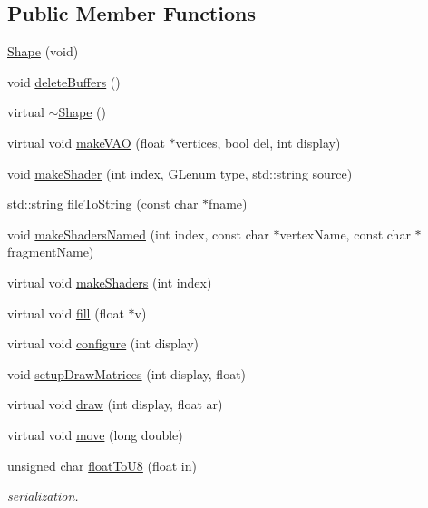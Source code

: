 \subsection*{Public Member Functions}
\begin{DoxyCompactItemize}
\item 
\hyperlink{classShape_a2c81e227edd2803a084c65c75e4ffd5b}{Shape} (void)
\item 
void \hyperlink{classShape_aa1d6e083d4bfe3793e53f30d092e6849}{delete\-Buffers} ()
\item 
virtual \hyperlink{classShape_a935afc9e576015f967d90de56977167d}{$\sim$\-Shape} ()
\item 
virtual void \hyperlink{classShape_afd5e29777ce90db927874c3a788fa7c1}{make\-V\-A\-O} (float $\ast$vertices, bool del, int display)
\item 
void \hyperlink{classShape_a7523425d407dd5087d8a036579560861}{make\-Shader} (int index, G\-Lenum type, std\-::string source)
\item 
std\-::string \hyperlink{classShape_a2ba56820a00ef275ce4e961fb633de5f}{file\-To\-String} (const char $\ast$fname)
\item 
void \hyperlink{classShape_a420de7854d2172951554999af84eb251}{make\-Shaders\-Named} (int index, const char $\ast$vertex\-Name, const char $\ast$fragment\-Name)
\item 
virtual void \hyperlink{classShape_a5503cd8cdc38875bcbe2e886f1609d7b}{make\-Shaders} (int index)
\item 
virtual void \hyperlink{classShape_a33be64d8e24518084b1c8f974f808387}{fill} (float $\ast$v)
\item 
virtual void \hyperlink{classShape_a5de43e4fb0921bac5f8a4a95e771e354}{configure} (int display)
\item 
void \hyperlink{classShape_a7d1f29c73622a3f32301ea59bfd89d32}{setup\-Draw\-Matrices} (int display, float)
\item 
virtual void \hyperlink{classShape_a892243993a2207807ab5069ce90bbef4}{draw} (int display, float ar)
\item 
virtual void \hyperlink{classShape_ac39d8d75d7498e3cd5395b8485fbf39f}{move} (long double)
\item 
unsigned char \hyperlink{classShape_ab001ba78956680cff154e302826f909d}{float\-To\-U8} (float in)
\begin{DoxyCompactList}\small\item\em serialization. \end{DoxyCompactList}\item 

\end{DoxyCompactItemize}
